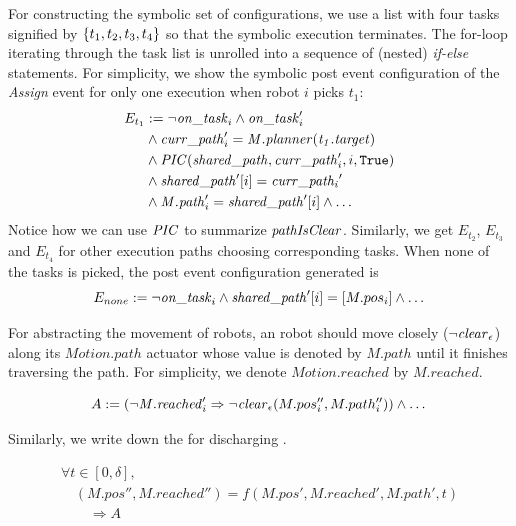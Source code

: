 For constructing the symbolic set of configurations,
we use a list with four tasks signified by $\left\{t_1,t_2,t_3,t_4\right\}$ so that the symbolic execution terminates.
The for-loop iterating through the task list is unrolled into a sequence of (nested) \emph{if-else} statements.
For simplicity,
we show the symbolic post event configuration of the \emph{Assign} event for only one execution when robot $i$ picks $t_1$:
\begin{align*}
    E_{t_1} &:= \neg\mathit{on\_task}_i \land \mathit{on\_task}_i' \\
            & \land \mathit{curr\_path}_i' = \mathit{M.planner(t_1.target)} \\
            & \land \mathit{PIC}(\mathit{shared\_path}, \mathit{curr\_path}_i', i, \mathtt{True}) \\
            & \land \mathit{shared\_path}'[i] = \mathit{curr\_path_i}' \\
            & \land \mathit{M.path}_i' = \mathit{shared\_path}'[i] \land \dots
\end{align*}
Notice how we can use $\mathit{PIC}$ to summarize $\mathit{pathIsClear}$.
Similarly, we get $E_{t_2}$, $E_{t_3}$ and $E_{t_4}$ for other execution paths choosing corresponding tasks.
When none of the tasks is picked, the post event configuration generated is
\[
E_{none} :=\neg\mathit{on\_task}_i \land \mathit{shared\_path}'[i] = [M.pos_i] \land \dots
\]

For abstracting the movement of robots,
an robot should move closely ($\neg\mathit{clear}_\epsilon$) along its $\mathit{Motion.path}$ actuator whose value is denoted by $\mathit{M.path}$ until it finishes traversing the path.
For simplicity, we denote $\mathit{Motion.reached}$ by $\mathit{M.reached}$.
\begin{assumption}
    \label{stlinemotion}
\[
A := (\neg \mathit{M.reached}'_i \Rightarrow \neg\mathit{clear}_\epsilon(M.pos_i'', M.path_i'')) \land \dots
\]
\end{assumption}\noindent
Similarly, we write down the  for discharging .
\begin{proofob}
    \small
\[
\begin{array}{l}
    \forall t \in [0, \delta], \\
\quad  (M.pos'', M.reached'') = f(M.pos', M.reached', M.path', t) \\
\qquad \Rightarrow A
\end{array}
\]
\end{proofob}

